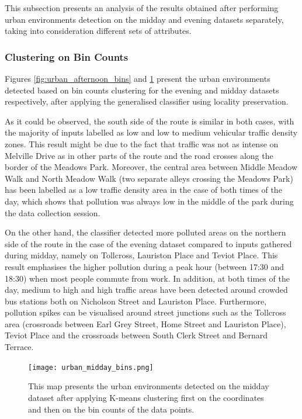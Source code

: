 \documentclass[bsc,frontabs,twoside,singlespacing, parskip,deptreport]{infthesis}     %
\begin{document}
This subsection presents an analysis of the results obtained after performing urban environments detection on the midday and evening datasets separately, taking into consideration different sets of attributes.

\subsubsection*{Clustering on Bin Counts}

Figures \ref{fig:urban_afternoon_bins} and \ref{fig:urban_midday_bins} present the urban environments detected based on bin counts clustering for the evening and midday datasets respectively, after applying the generalised classifier using locality preservation.

As it could be observed, the south side of the route is similar in both cases, with the majority of inputs labelled as low and low to medium vehicular traffic density zones. This result might be due to the fact that traffic was not as intense on Melville Drive as in other parts of the route and the road crosses along the border of the Meadows Park. Moreover, the central area between Middle Meadow Walk and North Meadow Walk (two separate alleys crossing the Meadows Park) has been labelled as a low traffic density area in the case of both times of the day, which shows that pollution was always low in the middle of the park during the data collection session.

On the other hand, the classifier detected more polluted areas on the northern side of the route in the case of the evening dataset compared to inputs gathered during midday, namely on Tollcross, Lauriston Place and Teviot Place. This result emphasises the higher pollution during a peak hour (between 17:30 and 18:30) when most people commute from work. In addition, at both times of the day, medium to high and high traffic areas have been detected around crowded bus stations both on Nicholson Street and Lauriston Place. Furthermore, pollution spikes can be visualised around street junctions such as the Tollcross area (crossroads between Earl Grey Street, Home Street and Lauriston Place), Teviot Place and the crossroads between South Clerk Street and Bernard Terrace.


\begin{figure}[h!]
  \center
  \texttt{[image: urban\_midday\_bins.png]}
  \caption{This map presents the urban environments detected on the midday dataset after applying K-means clustering first on the coordinates and then on the bin counts of the data points.}
  \label{fig:urban_midday_bins}
\end{figure}
\end{document}
